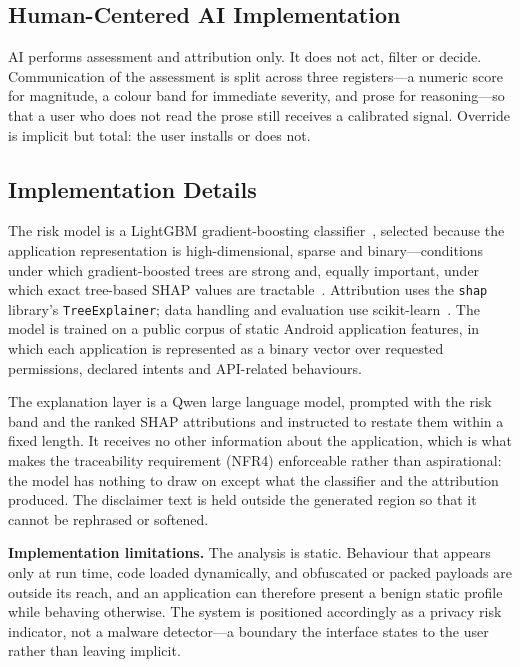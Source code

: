 \documentclass[sigconf]{acmart}
\begin{document}
\subsection{Human-Centered AI Implementation}

AI performs assessment and attribution only. It does not act, filter or
decide. Communication of the assessment is split across three registers---a
numeric score for magnitude, a colour band for immediate severity, and
prose for reasoning---so that a user who does not read the prose still
receives a calibrated signal. Override is implicit but total: the user
installs or does not.

\subsection{Implementation Details}

The risk model is a LightGBM gradient-boosting
classifier~\cite{ke2017lightgbm}, selected because the application
representation is high-dimensional, sparse and binary---conditions under
which gradient-boosted trees are strong and, equally important, under which
exact tree-based SHAP values are tractable~\cite{lundberg2020treeshap}.
Attribution uses the \texttt{shap} library's \texttt{TreeExplainer};
data handling and evaluation use scikit-learn~\cite{pedregosa2011scikit}.
The model is trained on a public corpus of static Android application
features, in which each application is represented as a binary vector over
requested permissions, declared intents and API-related behaviours.

The explanation layer is a Qwen large language model, prompted with the
risk band and the ranked SHAP attributions and instructed to restate them
within a fixed length. It receives no other information about the
application, which is what makes the traceability requirement (NFR4)
enforceable rather than aspirational: the model has nothing to draw on
except what the classifier and the attribution produced. The disclaimer
text is held outside the generated region so that it cannot be rephrased
or softened.

\textbf{Implementation limitations.} The analysis is static. Behaviour that
appears only at run time, code loaded dynamically, and obfuscated or
packed payloads are outside its reach, and an application can therefore
present a benign static profile while behaving otherwise. The system is
positioned accordingly as a privacy risk indicator, not a malware
detector---a boundary the interface states to the user rather than leaving
implicit.
\end{document}
